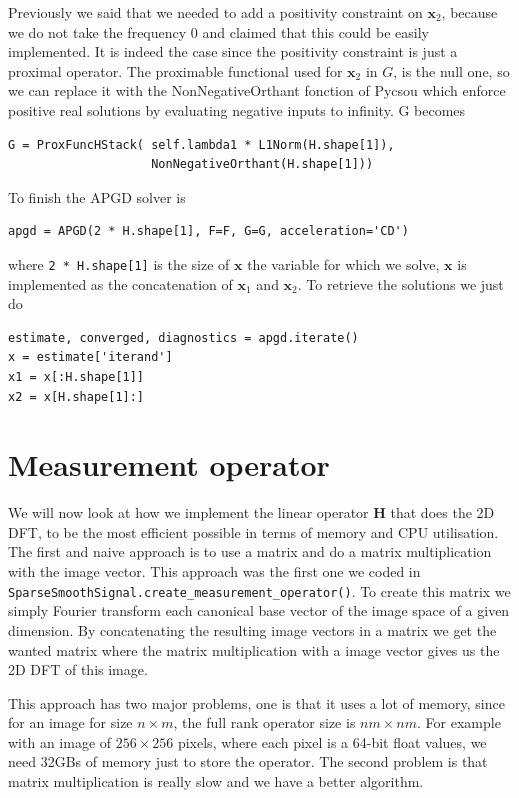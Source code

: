 \documentclass[a4paper,11pt,oneside]{report}
\theoremstyle{named}
\begin{document}
Previously we said that we needed to  add a positivity constraint on $\boldsymbol{x}_2$, because we do not take the frequency 0 and claimed that this could be easily implemented. It is indeed the case since the positivity constraint is just a proximal operator. The proximable functional used for $\boldsymbol{x}_2$ in $G$, is the null one, so we can replace it with the NonNegativeOrthant fonction of Pycsou which enforce positive real solutions by evaluating negative inputs to infinity. G becomes
\begin{verbatim}
G = ProxFuncHStack( self.lambda1 * L1Norm(H.shape[1]), 
                    NonNegativeOrthant(H.shape[1]))
\end{verbatim}
To finish the APGD solver is
\begin{verbatim}
apgd = APGD(2 * H.shape[1], F=F, G=G, acceleration='CD')
\end{verbatim}
where \verb+2 * H.shape[1]+ is the size of $\boldsymbol{x}$ the variable for which we solve, $\boldsymbol{x}$ is implemented as the concatenation of $\boldsymbol{x}_1$ and $\boldsymbol{x}_2$. To retrieve the solutions we just do
\begin{verbatim}
estimate, converged, diagnostics = apgd.iterate()
x = estimate['iterand']
x1 = x[:H.shape[1]]
x2 = x[H.shape[1]:] 
\end{verbatim}

\section{Measurement operator}
We will now look at how we implement the linear operator $\boldsymbol{H}$ that does the 2D DFT, to be the most efficient possible in terms of memory and CPU utilisation. The first and naive approach is to use a matrix and do a matrix multiplication with the image vector. This approach was the first one we coded in \verb+SparseSmoothSignal.create_measurement_operator()+. To create this matrix we simply Fourier transform each canonical base vector of the image space of a given dimension. By concatenating the resulting image vectors in a matrix we get the wanted matrix where the matrix multiplication with a image vector gives us the 2D DFT of this image. 

This approach has two major problems, one is that it uses a lot of memory, since for an image for size $n \times m$, the full rank operator size is $nm \times nm$. For example with an image of $256 \times 256$ pixels, where each pixel is a 64-bit float values, we need 32GBs of memory just to store the operator. The second problem is that matrix multiplication is really slow and we have a better algorithm. 
\end{document}
